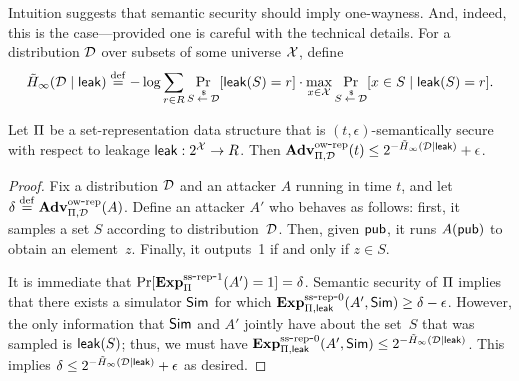  

Intuition suggests that semantic security should imply one-wayness. And, indeed, this is
the case---provided one is careful with the technical details.
For a distribution ${\cal D}$
over subsets of some universe ${\cal X}$, define
\[\tilde H_\infty({\cal D} \mid {\sf leak}) \stackrel{\rm def}{=} -\log \sum_{r \in R} \Pr_{S {\:\stackrel{{\scriptscriptstyle \hspace{0.2em}\$}} {\leftarrow}\:} {\cal D}}[{\sf leak}(S)=r] \cdot
\max_{x \in {\cal X}} \Pr_{S {\:\stackrel{{\scriptscriptstyle \hspace{0.2em}\$}} {\leftarrow}\:} {\cal D}}[x \in S \mid {\sf leak}(S)=r].\]


\begin{theorem}
Let $\Pi$ be a set-representation data structure that is $(t, \epsilon)$-semantically secure
with respect to leakage ${\sf leak}:2^{\cal X} \rightarrow R$.
Then $\mathrm{\mathbf{Adv}}^{\mathrm{ow\mbox{-}rep}}_{\Pi,\mathcal{D}}(t) \leq 2^{-\tilde H_\infty({\cal D} \mid {\sf leak})} + \epsilon$.
\end{theorem}
\begin{proof}
Fix a distribution ${\cal D}$ and an attacker
$A$ running in time $t$, and let $\delta \stackrel{\rm def}{=} \mathrm{\mathbf{Adv}}^{\mathrm{ow\mbox{-}rep}}_{\Pi,\mathcal{D}}(A)$.
Define an attacker $A'$ who behaves as follows: first, it samples a set $S$ according to
distribution~${\cal D}$. Then, given ${\sf pub}$, it runs $A({\sf pub})$ to obtain an element~$z$.
Finally, it outputs~1 if and only if $z \in S$.

It is immediate that $\Pr[\mathrm{\mathbf{Exp}}^{\mathrm{ss\mbox{-}rep\mbox{-}1}}_{\Pi}(A')=1] = \delta$. Semantic
security of $\Pi$ implies that there exists a simulator ${\sf Sim}$ for which
$\mathrm{\mathbf{Exp}}^{\mathrm{ss\mbox{-}rep\mbox{-}0}}_{\Pi, {\sf leak}}(A', {\sf Sim}) \geq \delta - \epsilon$. However,
the only information
that ${\sf Sim}$
and $A'$ jointly have about the set~$S$ that was sampled is ${\sf leak}(S)$; thus,
we must have $\mathrm{\mathbf{Exp}}^{\mathrm{ss\mbox{-}rep\mbox{-}0}}_{\Pi, {\sf leak}}(A', {\sf Sim}) \leq 2^{-\tilde H_\infty({\cal D} \mid {\sf leak})}$.
This implies
$\delta \leq 2^{-\tilde H_\infty({\cal D} \mid {\sf leak})}+\epsilon$ as desired.
\end{proof}

